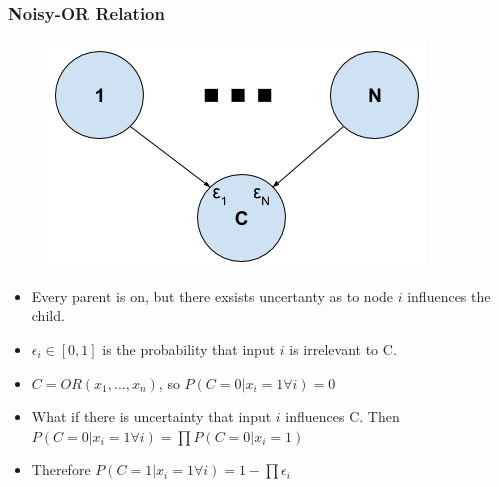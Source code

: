 \documentclass[]{beamer}
\begin{document}
\begin{frame}
\frametitle{Noisy-OR Relation}

\begin{figure}
\centering
	\begin{minipage}[b]{0.4\textwidth}
		\includegraphics[width=\textwidth]{Images/NoisyOR.png}
	\end{minipage}
	\hfill
\end{figure}

\begin{itemize}
\item Every parent is on, but there exsists uncertanty as to node $i$ influences the child.
\item $\epsilon_i \in [0,1]$ is the probability that input $i$ is irrelevant to C. 
\item $C = OR(x_1, ..., x_n)$, so $P(C = 0 | x_i = 1 \forall i) = 0$ 
\item What if there is uncertainty that input $i$ influences C. Then $P(C = 0 | x_i = 1 \forall i) = \prod P(C = 0 | x_i = 1)$
\item Therefore $P(C = 1 | x_i = 1 \forall i) = 1 - \prod \epsilon_i$
\end{itemize}

\end{frame}
\end{document}
